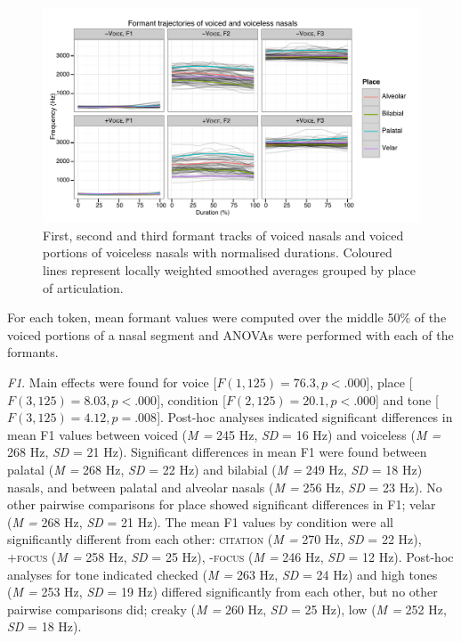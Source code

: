 \documentclass[12pt]{article}
\newcommand{\condc}{\textsc{citation }}
\newcommand{\condf}{\textsc{+focus }}
\newcommand{\condu}{\textsc{-focus }}
\begin{document}
\begin{figure}[h!]
	\centering
	\includegraphics[scale=1.0]{figures/formants.pdf}
	\caption{First, second and third formant tracks of voiced nasals and voiced portions of voiceless nasals with normalised durations. Coloured lines represent locally weighted smoothed averages grouped by place of articulation.}
	\label{fig:formants}
\end{figure}

\newpage

For each token, mean formant values were computed over the middle 50\% of the voiced portions of a nasal segment and ANOVAs were performed with each of the formants.

\emph{F1}. Main effects were found for voice [$F(1, 125) = 76.3, p < .000$], place [$F(3, 125) = 8.03, p < .000$], condition [$F(2, 125) = 20.1, p < .000$] and tone [$F(3, 125) = 4.12, p = .008$]. Post-hoc analyses indicated significant differences in mean F1 values between voiced (\emph{M = } 245 Hz, \emph{SD} = 16 Hz) and voiceless (\emph{M = } 268 Hz, \emph{SD} = 21 Hz). Significant differences in mean F1 were found between palatal (\emph{M = } 268 Hz, \emph{SD} = 22 Hz) and bilabial (\emph{M = } 249 Hz, \emph{SD} = 18 Hz) nasals, and between palatal and alveolar nasals (\emph{M = } 256 Hz, \emph{SD} = 23 Hz). No other pairwise comparisons for place showed significant differences in F1; velar (\emph{M = } 268 Hz, \emph{SD} = 21 Hz). The mean F1 values by condition were all significantly different from each other: \condc (\emph{M = } 270 Hz, \emph{SD} = 22 Hz), \condf (\emph{M = } 258 Hz, \emph{SD} = 25 Hz), \condu (\emph{M = } 246 Hz, \emph{SD} = 12 Hz). Post-hoc analyses for tone indicated checked (\emph{M = } 263 Hz, \emph{SD} = 24 Hz) and high tones (\emph{M = } 253 Hz, \emph{SD} = 19 Hz) differed significantly from each other, but no other pairwise comparisons did; creaky (\emph{M = } 260 Hz, \emph{SD} = 25 Hz), low (\emph{M = } 252 Hz, \emph{SD} = 18 Hz).
\end{document}
